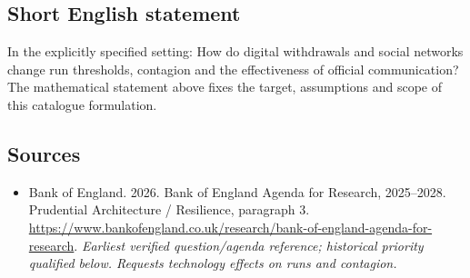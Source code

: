 \documentclass[11pt]{article}
\begin{document}
\subsection{Short English statement}
In the explicitly specified setting: How do digital withdrawals and social networks change run thresholds, contagion and the effectiveness of official communication? The mathematical statement above fixes the target, assumptions and scope of this catalogue formulation.

\subsection{Sources}
\begin{itemize}\raggedright
\item[\textnormal{[S1]}]\hypertarget{source:30007604:1}{} Bank of England. 2026. Bank of England Agenda for Research, 2025–2028. Prudential Architecture / Resilience, paragraph 3.
\url{https://www.bankofengland.co.uk/research/bank-of-england-agenda-for-research}.
{\small\textit{Earliest verified question/agenda reference; historical priority qualified below. Requests technology effects on runs and contagion.}}
\end{itemize}
\end{document}
